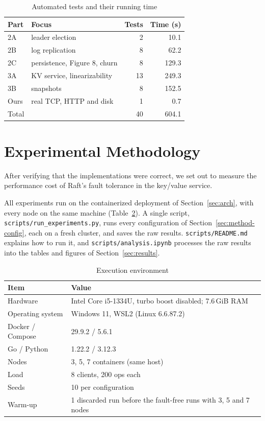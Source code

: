 \documentclass[conference]{IEEEtran}
\begin{document}
\begin{table}[h]
\centering
\small
\caption{Automated tests and their running time}\label{tab:tests}
\setlength{\tabcolsep}{4pt}
\begin{tabular}{@{}llrr@{}}
\toprule
Part & Focus & Tests & Time (s) \\
\midrule
2A & leader election & 2 & 10.1 \\
2B & log replication & 8 & 62.2 \\
2C & persistence, Figure 8, churn & 8 & 129.3 \\
3A & KV service, linearizability & 13 & 249.3 \\
3B & snapshots & 8 & 152.5 \\
Ours & real TCP, HTTP and disk & 1 & 0.7 \\
\midrule
Total & & 40 & 604.1 \\
\bottomrule
\end{tabular}
\end{table}

\section{Experimental Methodology}\label{sec:method}
After verifying that the implementations were correct, we set out to measure the performance cost of Raft's fault tolerance in the key/value service.

All experiments run on the containerized deployment of Section~\ref{sec:arch}, with every node on the same machine (Table~\ref{tab:env}). A single script, \texttt{scripts/run\_experiments.py}, runs every configuration of Section~\ref{sec:method-config}, each on a fresh cluster, and saves the raw results. \texttt{scripts/README.md} explains how to run it, and \texttt{scripts/analysis.ipynb} processes the raw results into the tables and figures of Section~\ref{sec:results}.

\begin{table}[h]
\centering
\small
\caption{Execution environment}\label{tab:env}
\begin{tabular}{@{}lp{50mm}@{}}
\toprule
Item & Value \\
\midrule
Hardware & Intel Core i5-1334U, turbo boost disabled; 7.6\,GiB RAM \\
Operating system & Windows 11, WSL2 (Linux 6.6.87.2) \\
Docker / Compose & 29.9.2 / 5.6.1 \\
Go / Python & 1.22.2 / 3.12.3 \\
Nodes & 3, 5, 7 containers (same host) \\
Load & 8 clients, 200 ops each \\
Seeds & 10 per configuration \\
Warm-up & 1 discarded run before the fault-free runs with 3, 5 and 7 nodes \\
\bottomrule
\end{tabular}
\end{table}
\end{document}
